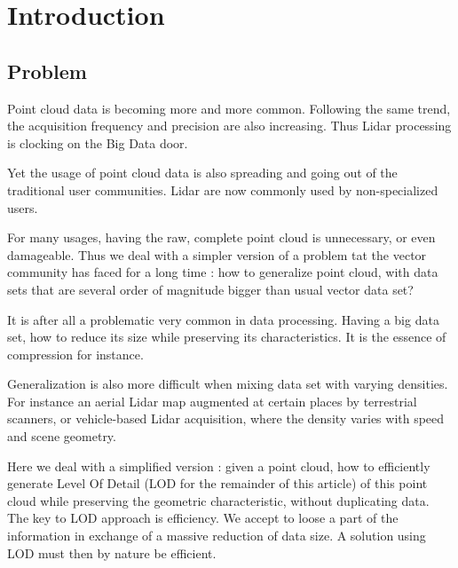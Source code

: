 

\section{Introduction}
	\subsection{Problem} 
	 
		Point cloud data is becoming more and more common. Following the same trend, the acquisition frequency and precision are also increasing.
		Thus Lidar processing is clocking on the Big Data door.
		
		Yet the usage of point cloud data is also spreading and going out of the traditional user communities. 
		Lidar are now commonly used by non-specialized users. 
		
		
		For many usages, having the raw, complete point cloud is unnecessary, or even damageable.
		Thus we deal with a simpler version of a problem tat the vector community has faced for a long time : how to generalize point cloud, with data sets that are several order of magnitude bigger than usual vector data set?
		
		It is after all a problematic very common in data processing. Having a big data set, how to reduce its size while preserving its characteristics.
		It is the essence of compression for instance.
		
		Generalization is also more difficult when mixing data set with varying densities. For instance an aerial Lidar map augmented at certain places by terrestrial scanners, or vehicle-based Lidar acquisition, where the density varies with speed and scene geometry.
		
		Here we deal with a simplified version : given a point cloud, how to efficiently generate Level Of Detail (LOD for the remainder of this article) of this point cloud while preserving the geometric characteristic, without duplicating data.
		The key to LOD approach is efficiency. We accept to loose a part of the information in exchange of a massive reduction of data size. A solution using LOD must then by nature be efficient.
		
